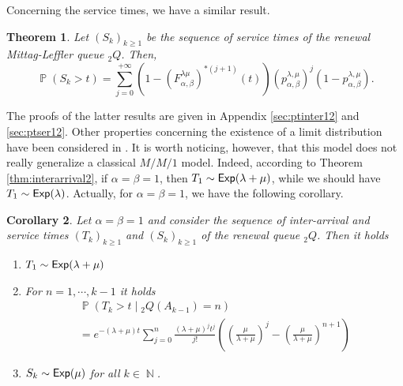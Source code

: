 \documentclass[]{amsart}
\numberwithin{equation}{section}
\newtheorem{thm}{Theorem}[section]
\newtheorem{cor}[thm]{Corollary}
\theoremstyle{remark}
\theoremstyle{definition}
\DeclareMathOperator{\N}{\mathbb{N}}
\DeclareMathOperator{\bP}{\mathbb{P}}
\begin{document}
Concerning the service times, we have a similar result.
\begin{thm}\label{thm:service2}
	Let $(S_k)_{k \ge 1}$ be the sequence of service times of the renewal Mittag-Leffler queue ${}_2Q$. Then,
	\begin{equation*}
		\bP(S_k>t)
		=\sum_{j=0}^{+\infty}(1-(F_{\alpha,\beta}^{\lambda \mu})^{\ast (j+1)}(t))(p_{\alpha,\beta}^{\lambda,\mu})^j(1-p_{\alpha,\beta}^{\lambda,\mu}).
	\end{equation*}
\end{thm}
{The proofs of the latter results are given in Appendix \ref{sec:ptinter12} and \ref{sec:ptser12}.} 
Other properties concerning the existence of a limit distribution have been considered in \cite{butt2023queuing}. It is worth noticing, however, that this model does not really generalize a classical $M/M/1$ model. Indeed, according to Theorem \ref{thm:interarrival2}, if $\alpha=\beta=1$, then $T_1 \sim{\sf Exp}(\lambda+\mu)$, while we should have $T_1 \sim {\sf Exp}(\lambda)$. Actually, for $\alpha=\beta=1$, we have the following corollary.
\begin{cor}\label{cor:toMM1}
	Let $\alpha=\beta=1$ and consider the sequence of inter-arrival and service times $(T_k)_{k \ge 1}$ and $(S_k)_{k \ge 1}$ of the renewal queue ${}_2Q$. Then it holds
	\begin{enumerate}
		\item $T_1 \sim {\sf Exp}(\lambda+\mu)$
		\item For $n=1,\cdots,k-1$ it holds
		\begin{multline*}
			\bP(T_k>t \mid {}_2Q(A_{k-1})=n)\\=e^{-(\lambda+\mu)t}\sum_{j=0}^{n}\frac{(\lambda+\mu)^jt^j}{j!}\left(\left(\frac{\mu}{\lambda+\mu}\right)^{j}-\left(\frac{\mu}{\lambda+\mu}\right)^{n+1}\right)
		\end{multline*}
		\item $S_k \sim {\sf Exp}(\mu)$ for all $k \in \N$.
	\end{enumerate}
\end{cor}
\end{document}
